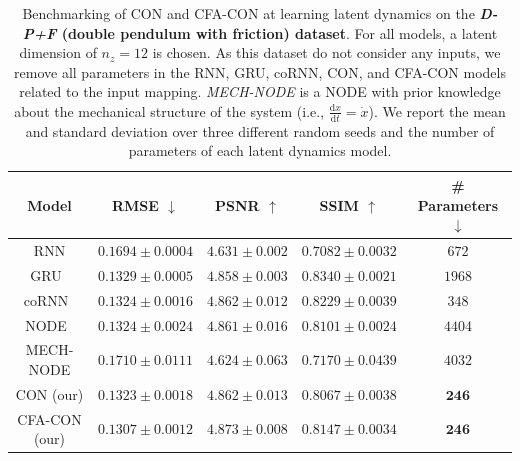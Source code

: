 \begin{table}[ht]
    \centering
    \begin{small}
    \begin{tabular}{c c c c c}
         \toprule
         \textbf{Model} & \textbf{RMSE} $\downarrow$ & \textbf{PSNR} $\uparrow$ & \textbf{SSIM} $\uparrow$ & \textbf{\# Parameters} $\downarrow$ \\
         \midrule
         RNN & $0.1694 \pm 0.0004$ & $4.631 \pm 0.002$ & $0.7082 \pm 0.0032$ & $672$\\
         GRU~\citep{cho2014learning} & $0.1329 \pm 0.0005$ & $4.858 \pm 0.003$ & $\mathbf{0.8340 \pm 0.0021}$ & $1968$\\
         coRNN~\citep{rusch2020coupled} & $0.1324 \pm 0.0016$ & $4.862 \pm 0.012$ & $0.8229 \pm 0.0039$ & $348$\\
         NODE~\citep{chen2018neural} & $0.1324 \pm 0.0024$ & $4.861 \pm 0.016$ & $0.8101 \pm 0.0024$ & $4404$\\
         MECH-NODE & $0.1710 \pm 0.0111$ & $4.624 \pm 0.063$ & $0.7170 \pm 0.0439$ & $4032$\\
         CON (our) & $0.1323 \pm 0.0018$ & $4.862 \pm 0.013$ & $0.8067 \pm 0.0038$ & $\mathbf{246}$\\
         CFA-CON (our) & $\mathbf{0.1307 \pm 0.0012}$ & $\mathbf{4.873 \pm 0.008}$ & $0.8147 \pm 0.0034$ & $\mathbf{246}$\\
         \bottomrule
    \end{tabular}
    \end{small}
    \vspace{0.5cm}
    \caption{Benchmarking of \gls{CON} and \gls{CFA-CON} at learning latent dynamics on the \textbf{\emph{D-P+F} (double pendulum with friction) dataset}. For all models, a latent dimension of $n_z=12$ is chosen. 
    As this dataset do not consider any inputs, we remove all parameters in the RNN, GRU, coRNN, CON, and CFA-CON models related to the input mapping.
    \emph{MECH-NODE} is a \gls{NODE} with prior knowledge about the mechanical structure of the system (i.e., $\frac{\mathrm{d}x}{\mathrm{d}t} = \dot{x}$). We report the mean and standard deviation over three different random seeds and the number of parameters of each latent dynamics model.
    }
    \label{tab:apx-con:latent_dynamics_results:d_p_f}
\end{table}

